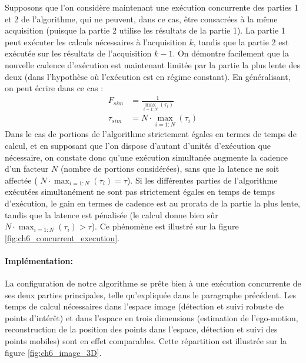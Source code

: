 Supposons que l'on considère maintenant une exécution concurrente des parties 1 et 2 de l'algorithme, qui ne peuvent, dans ce cas, être consacrées à la même acquisition (puisque la partie 2 utilise les résultats de la partie 1). La partie 1 peut exécuter les calculs nécessaires à l'acquisition $k$, tandis que la partie 2 est exécutée sur les résultats de l'acquisition $k-1$. On démontre facilement que la nouvelle cadence d'exécution est maintenant limitée par la partie la plus lente des deux (dans l'hypothèse où l'exécution est en régime constant). En généralisant, on peut écrire dans ce cas :
\begin{align}
	F_{sim} &= \frac{1}{\max\limits_{i=1:N} (\tau_i) } \\
	\tau_{sim} &= N \cdot \max_{i=1:N} (\tau_i)
\end{align}
Dans le cas de portions de l'algorithme strictement égales en termes de temps de calcul, et en supposant que l'on dispose d'autant d'unités d'exécution que nécessaire, on constate donc qu'une exécution simultanée augmente la cadence d'un facteur $N$ (nombre de portions considérées), sans que la latence ne soit affectée ( $N \cdot \max_{i=1:N} (\tau_i) = \tau$). Si les différentes parties de l'algorithme exécutées simultanément ne sont pas strictement égales en temps de temps d'exécution, le gain en termes de cadence est au prorata de la partie la plus lente, tandis que la latence est pénalisée (le calcul donne bien sûr $N \cdot \max_{i=1:N} (\tau_i) > \tau$). Ce phénomène est illustré sur la figure \ref{fig:ch6_concurrent_execution}.

\paragraph{Implémentation:\\}
La configuration de notre algorithme se prête bien à une exécution concurrente de ses deux parties principales, telle qu'expliquée dans le paragraphe précédent. Les temps de calcul nécessaires dans l'espace image (détection et suivi robuste de points d'intérêt) et dans l'espace en trois dimensions (estimation de l'ego-motion, reconstruction de la position des points dans l'espace, détection et suivi des points mobiles) sont en effet comparables. Cette répartition est illustrée sur la figure \ref{fig:ch6_image_3D}.

